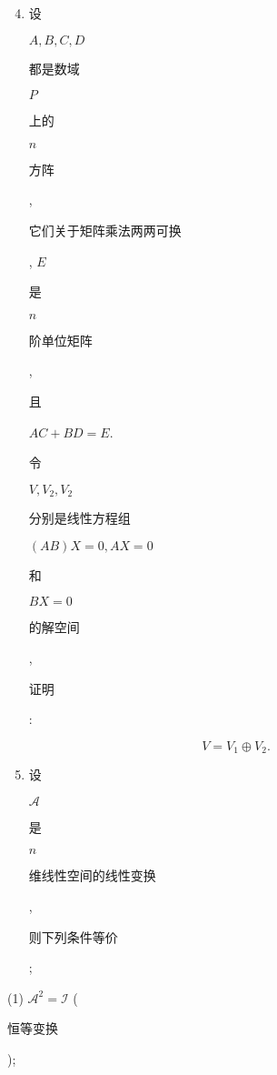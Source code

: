 \documentclass[10pt]{article}
\begin{document}
\begin{enumerate}
  \setcounter{enumi}{3}
  \item \begin{CJK}{UTF8}{mj}设\end{CJK} $A, B, C, D$ \begin{CJK}{UTF8}{mj}都是数域\end{CJK} $P$ \begin{CJK}{UTF8}{mj}上的\end{CJK} $n$ \begin{CJK}{UTF8}{mj}方阵\end{CJK}, \begin{CJK}{UTF8}{mj}它们关于矩阵乘法两两可换\end{CJK}, $E$ \begin{CJK}{UTF8}{mj}是\end{CJK} $n$ \begin{CJK}{UTF8}{mj}阶单位矩阵\end{CJK}, \begin{CJK}{UTF8}{mj}且\end{CJK} $A C+B D=E$. \begin{CJK}{UTF8}{mj}令\end{CJK} $V, V_{2}, V_{2}$ \begin{CJK}{UTF8}{mj}分别是线性方程组\end{CJK} $(A B) X=0, A X=0$ \begin{CJK}{UTF8}{mj}和\end{CJK} $B X=0$ \begin{CJK}{UTF8}{mj}的解空间\end{CJK}, \begin{CJK}{UTF8}{mj}证明\end{CJK}:
\end{enumerate}
$$
V=V_{1} \oplus V_{2} .
$$

\begin{enumerate}
  \setcounter{enumi}{4}
  \item \begin{CJK}{UTF8}{mj}设\end{CJK} $\mathscr{A}$ \begin{CJK}{UTF8}{mj}是\end{CJK} $n$ \begin{CJK}{UTF8}{mj}维线性空间的线性变换\end{CJK}, \begin{CJK}{UTF8}{mj}则下列条件等价\end{CJK};
\end{enumerate}
(1) $\mathscr{A}^{2}=\mathscr{I}$ (\begin{CJK}{UTF8}{mj}恒等变换\end{CJK});
\end{document}
